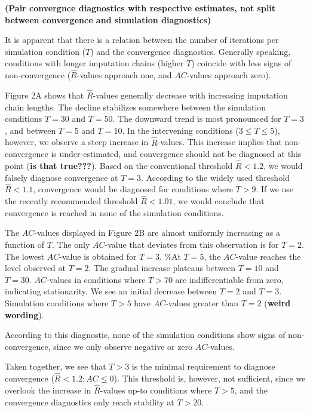 \documentclass[Royal,times,sageh]{sagej}
\begin{document}
\textbf{(Pair convergnce diagnostics with respective estimates, not
split between convergence and simulation diagnostics)}

It is apparent that there is a relation between the number of iterations
per simulation condition (\(T\)) and the convergence diagnostics.
Generally speaking, conditions with longer imputation chains (higher
\(T\)) coincide with less signs of non-convergence
(\(\widehat{R}\)-values approach one, and \(AC\)-values approach zero).

Figure 2A shows that \(\widehat{R}\)-values generally decrease with
increasing imputation chain lengths. The decline stabilizes somewhere
between the simulation conditions \(T=30\) and \(T=50\). The downward
trend is most pronounced for \(T=3\), and between \(T = 5\) and
\(T = 10\). In the intervening conditions (\(3 \leq T \leq 5\)),
however, we observe a steep increase in \(\widehat{R}\)-values. This
increase implies that non-convergence is under-estimated, and
convergence should not be diagnosed at this point (\textbf{is that
true???}). Based on the conventional threshold \(\widehat{R} < 1.2\), we
would falsely diagnose convergence at \(T=3\). According to the widely
used threshold \(\widehat{R} < 1.1\), convergence would be diagnosed for
conditions where \(T>9\). If we use the recently recommended threshold
\(\widehat{R} < 1.01\), we would conclude that convergence is reached in
none of the simulation conditions.

The \(AC\)-values displayed in Figure 2B are almost uniformly increasing
as a function of \(T\). The only \(AC\)-value that deviates from this
observation is for \(T=2\). The lowest \(AC\)-value is obtained for
\(T=3\). \%At \(T=5\), the \(AC\)-value reaches the level observed at
\(T=2\). The gradual increase plateaus between \(T=10\) and \(T=30\).
\(AC\)-values in conditions where \(T>70\) are indifferentiable from
zero, indicating stationarity. We see an initial decrease between
\(T=2\) and \(T=3\). Simulation conditions where \(T>5\) have
\(AC\)-values greater than \(T=2\) (\textbf{weird wording}).

According to this diagnostic, none of the simulation conditions show
signs of non-convergence, since we only observe negative or zero
\(AC\)-values.

Taken together, we see that \(T>3\) is the minimal requirement to
diagnose convergence (\(\widehat{R} < 1.2; AC \leq 0\)). This threshold
is, however, not sufficient, since we overlook the increase in
\(\widehat{R}\)-values up-to conditions where \(T>5\), and the
convergence diagnostics only reach stability at \(T>20\).
\end{document}
